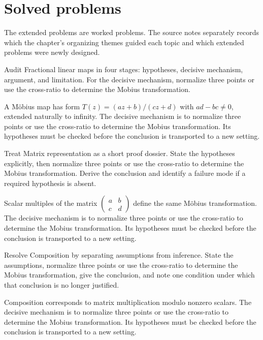\section{Solved problems}
The extended problems are worked problems. The source notes separately records which the chapter's organizing themes guided each topic and which extended problems were newly designed.

\begin{problem}\label{prob:iv16-problem-01}
Audit Fractional linear maps in four stages: hypotheses, decisive mechanism, argument, and limitation. For the decisive mechanism, normalize three points or use the cross-ratio to determine the Mobius transformation.
\end{problem}
\begin{solution}
A Möbius map has form $T(z)=(az+b)/(cz+d)$ with $ad-bc\ne0$, extended naturally to infinity. The decisive mechanism is to normalize three points or use the cross-ratio to determine the Mobius transformation. Its hypotheses must be checked before the conclusion is transported to a new setting.
\end{solution}

\begin{problem}\label{prob:iv16-problem-02}
Treat Matrix representation as a short proof dossier. State the hypotheses explicitly, then normalize three points or use the cross-ratio to determine the Mobius transformation. Derive the conclusion and identify a failure mode if a required hypothesis is absent.
\end{problem}
\begin{solution}
Scalar multiples of the matrix $\begin{pmatrix}a&b\\c&d\end{pmatrix}$ define the same Möbius transformation. The decisive mechanism is to normalize three points or use the cross-ratio to determine the Mobius transformation. Its hypotheses must be checked before the conclusion is transported to a new setting.
\end{solution}

\begin{problem}\label{prob:iv16-problem-03}
Resolve Composition by separating assumptions from inference. State the assumptions, normalize three points or use the cross-ratio to determine the Mobius transformation, give the conclusion, and note one condition under which that conclusion is no longer justified.
\end{problem}
\begin{solution}
Composition corresponds to matrix multiplication modulo nonzero scalars. The decisive mechanism is to normalize three points or use the cross-ratio to determine the Mobius transformation. Its hypotheses must be checked before the conclusion is transported to a new setting.
\end{solution}

